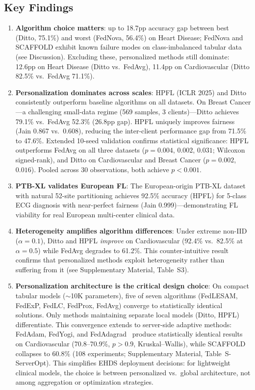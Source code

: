 \documentclass[conference,a4paper]{IEEEtran}
\begin{document}
\subsection{Key Findings}

\begin{enumerate}
    \item \textbf{Algorithm choice matters}: up to 18.7pp accuracy gap between best (Ditto, 75.1\%) and worst (FedNova, 56.4\%) on Heart Disease; FedNova and SCAFFOLD exhibit known failure modes on class-imbalanced tabular data (see Discussion). Excluding these, personalized methods still dominate: 12.6pp on Heart Disease (Ditto vs.\ FedAvg), 11.4pp on Cardiovascular (Ditto 82.5\% vs.\ FedAvg 71.1\%).

    \item \textbf{Personalization dominates across scales}: HPFL (ICLR 2025) and Ditto consistently outperform baseline algorithms on all datasets. On Breast Cancer---a challenging small-data regime (569 samples, 3 clients)---Ditto achieves 79.1\% vs.\ FedAvg 52.3\% (26.8pp gap). HPFL uniquely improves fairness (Jain 0.867 vs.\ 0.608), reducing the inter-client performance gap from 71.5\% to 47.6\%. Extended 10-seed validation confirms statistical significance: HPFL outperforms FedAvg on all three datasets ($p{=}0.004$, $0.002$, $0.031$; Wilcoxon signed-rank), and Ditto on Cardiovascular and Breast Cancer ($p{=}0.002$, $0.016$). Pooled across 30 observations, both achieve $p < 0.001$.

    \item \textbf{PTB-XL validates European FL}: The European-origin PTB-XL dataset with natural 52-site partitioning achieves 92.5\% accuracy (HPFL) for 5-class ECG diagnosis with near-perfect fairness (Jain 0.999)---demonstrating FL viability for real European multi-center clinical data.

    \item \textbf{Heterogeneity amplifies algorithm differences}: Under extreme non-IID ($\alpha{=}0.1$), Ditto and HPFL \textit{improve} on Cardiovascular (92.4\% vs.\ 82.5\% at $\alpha{=}0.5$) while FedAvg degrades to 61.2\%. This counter-intuitive result confirms that personalized methods exploit heterogeneity rather than suffering from it (see Supplementary Material, Table~S3).

    \item \textbf{Personalization architecture is the critical design choice}: On compact tabular models ($\sim$10K parameters), five of seven algorithms (FedLESAM, FedExP, FedLC, FedProx, FedAvg) converge to statistically identical solutions. Only methods maintaining separate local models (Ditto, HPFL) differentiate. This convergence extends to server-side adaptive methods: FedAdam, FedYogi, and FedAdagrad~\cite{reddi2021adaptive} produce statistically identical results on Cardiovascular (70.8--70.9\%, $p{>}0.9$, Kruskal--Wallis), while SCAFFOLD collapses to 60.8\% (108 experiments; Supplementary Material, Table~S-ServerOpt). This simplifies EHDS deployment decisions: for lightweight clinical models, the choice is between personalized vs.\ global architecture, not among aggregation or optimization strategies.


\end{enumerate}
\end{document}
